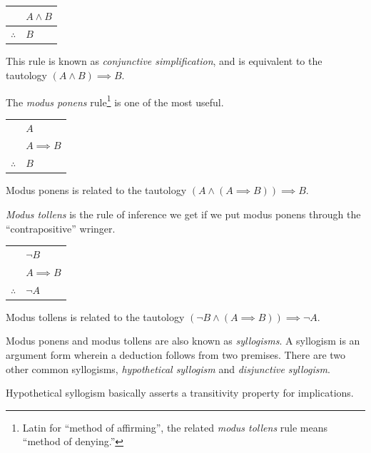 \begin{center}
\begin{tabular}{cl}
 & $A \land B$ \\ \hline
$\therefore$ & $B$\\
\end{tabular}
\end{center}
  
\noindent This rule is known as 
\emph{conjunctive simplification}, and
is equivalent to the tautology $(A \land B) \implies B$. 

The \emph{modus ponens} 
rule\footnote{Latin for ``method of affirming'',
the related \emph{modus tollens} rule means ``method of denying.''} 
is one of the most useful.

\begin{center}
\begin{tabular}{cl}
 & $A$ \\
 & $A \implies B$ \\ \hline
$\therefore$ & $B$ \\
\end{tabular}
\end{center}

Modus ponens is related to the tautology $(A \land (A \implies B)) \implies B$.

\emph{Modus tollens} 
is the rule of inference we get if we put modus ponens 
through the ``contrapositive'' wringer.

\begin{center}
\begin{tabular}{cl}
 & ${\lnot}B$ \\
 & $A \implies B$ \\ \hline
$\therefore$ & ${\lnot}A$ \\
\end{tabular}
\end{center}

Modus tollens is related to the tautology $({\lnot}B \land (A \implies B)) \implies {\lnot}A$.

Modus ponens and modus tollens are also known as 
\emph{syllogisms}.  A 
syllogism is an argument form wherein a deduction follows from two premises.
There are two other common syllogisms, 
\emph{hypothetical syllogism} and
\emph{disjunctive syllogism}.

Hypothetical syllogism basically asserts a transitivity property for 
implications.

